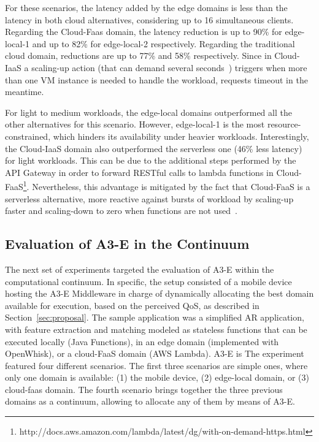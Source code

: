  For these scenarios, the latency added by the edge domains is less than the latency in both cloud alternatives, considering up to 16 simultaneous clients. Regarding the Cloud-Faas domain, the latency reduction is up to 90\% for edge-local-1 and up to 82\% for edge-local-2 respectively. Regarding the traditional cloud domain, reductions are up to 77\% and 58\% respectively. Since in Cloud-IaaS a scaling-up action (that can demand several seconds~\cite{Quatrocchi2016discrete}) triggers when more than one VM instance is needed to handle the workload, requests timeout in the meantime. 
 
 For light to medium workloads, the edge-local domains outperformed all the other alternatives for this scenario. However, edge-local-1 is the most resource-constrained, which hinders its availability under heavier workloads. Interestingly, the Cloud-IaaS domain also outperformed the serverless one (46\% less latency) for light workloads. This can be due to the additional steps performed by the API Gateway in order to forward RESTful calls to lambda functions in Cloud-FaaS\footnote{http://docs.aws.amazon.com/lambda/latest/dg/with-on-demand-https.html}. Nevertheless, this advantage is mitigated by the fact that Cloud-FaaS is a serverless alternative, more reactive against bursts of workload by scaling-up faster and scaling-down to zero when functions are not used~\cite{Villamizar2017lambda,Hendrickson:2016}.



\subsection{Evaluation of A3-E in the Continuum} 

The next set of experiments targeted the evaluation of A3-E within the computational continuum. In specific, the setup consisted of a mobile device hosting the A3-E Middleware in charge of dynamically allocating the best domain available for execution, based on the perceived QoS, as described in Section~\ref{sec:proposal}. The sample application was a simplified AR application, with feature extraction and matching modeled as stateless functions that can be executed locally (Java Functions), in an edge domain (implemented with OpenWhisk), or a cloud-FaaS domain (AWS Lambda).  A3-E is 
The experiment featured four different scenarios. The first three scenarios are simple ones, where only one domain is available: (1) the mobile device, (2) edge-local domain, or (3) cloud-faas domain. The fourth scenario brings together the three previous domains as a continuum, allowing to allocate any of them by means of A3-E. 

